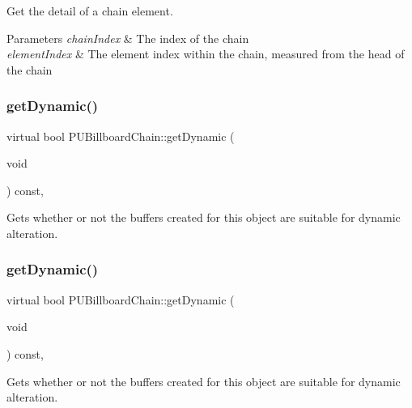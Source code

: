 Get the detail of a chain element. 
\begin{DoxyParams}{Parameters}
{\em chain\+Index} & The index of the chain \\
\hline
{\em element\+Index} & The element index within the chain, measured from the \textquotesingle{}head\textquotesingle{} of the chain \\
\hline
\end{DoxyParams}
\mbox{\label{classPUBillboardChain_af302a78ee0a7e43f27c6b15c8851da64}} 
\subsubsection{\texorpdfstring{get\+Dynamic()}{getDynamic()}\hspace{0.1cm}{\footnotesize\ttfamily [1/2]}}
{\footnotesize\ttfamily virtual bool P\+U\+Billboard\+Chain\+::get\+Dynamic (\begin{DoxyParamCaption}\item[{void}]{ }\end{DoxyParamCaption}) const\hspace{0.3cm}{\ttfamily [inline]}, {\ttfamily [virtual]}}

Gets whether or not the buffers created for this object are suitable for dynamic alteration. \mbox{\label{classPUBillboardChain_af302a78ee0a7e43f27c6b15c8851da64}} 
\subsubsection{\texorpdfstring{get\+Dynamic()}{getDynamic()}\hspace{0.1cm}{\footnotesize\ttfamily [2/2]}}
{\footnotesize\ttfamily virtual bool P\+U\+Billboard\+Chain\+::get\+Dynamic (\begin{DoxyParamCaption}\item[{void}]{ }\end{DoxyParamCaption}) const\hspace{0.3cm}{\ttfamily [inline]}, {\ttfamily [virtual]}}

Gets whether or not the buffers created for this object are suitable for dynamic alteration. \mbox{\label{classPUBillboardChain_af8944accdd3c6500700e4508feb703e9}} 
